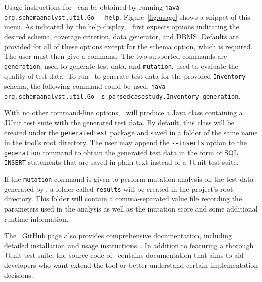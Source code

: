 


Usage instructions for \sa~can be obtained by running \lstinline{java org.schemaanalyst.util.Go --help}.
Figure~\ref{fig:usage} shows a snippet of this menu.  As indicated by the help display, \sa~first expects options
indicating the desired schema, coverage criterion, data generator, and DBMS\@. Defaults are provided for all of these
options except for the schema option, which is required. The user must then give a command.  The two supported commands
are \lstinline{generation}, used to generate test data, and \lstinline{mutation}, used to evaluate the quality of test
data.  To run \sa~to generate test data for the provided \texttt{Inventory} schema, the following command could be used:
\lstinline{java org.schemaanalyst.util.Go -s parsedcasestudy.Inventory generation}.


With no other command-line options, \sa~will produce a Java class containing a JUnit test suite with the generated test
data. By default, this class will be created under the \texttt{generatedtest} package and saved in a folder of the same
name in the tool's root directory.  The user may append the \lstinline{--inserts} option to the \lstinline{generation}
command to obtain the generated test data in the form of SQL \texttt{INSERT} statements that are saved in plain text
instead of a JUnit test suite.




If the \lstinline{mutation} command is given to perform mutation analysis on the test data generated by \sa, a folder
called \lstinline{results} will be created in the project's root directory. This folder will contain a comma-separated
value file recording the parameters used in the analysis as well as the mutation score and some additional runtime
information.


The \sa~GitHub page also provides comprehensive documentation, including detailed installation and usage
instructions~\cite{tool}. In addition to featuring a thorough JUnit test suite, the source code of \sa~contains
documentation that aims to aid developers who want extend the tool or better understand certain implementation
decisions.



